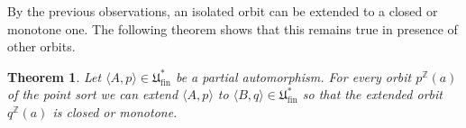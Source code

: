 \documentclass[10pt,a4paper]{article}
\newtheorem{tw}{Theorem}[section]
\theoremstyle{definition}
\theoremstyle{remark}
\newtheorem{observation}[tw]{Observation}
\newcommand \seq [1]{\langle #1 \rangle}
\newcommand \Z {\mathbb{Z}}
\newcommand \fin {{\operatorname{fin}}}
\newcommand \Ult {\mathfrak{U}}
\begin{document}

\medskip
By the previous observations,  an isolated orbit can be extended to a closed or monotone one.
The following theorem shows that this remains true in presence of other orbits.

\color{black}

\begin{tw}\label{closedormonotone}
    Let $\seq{A, p} \in \Ult^*_\fin$ be a partial automorphism.
    For every orbit $p^\Z(a)$ of the point sort we can extend $\seq{A, p}$ to $\seq{B, q} \in \Ult^*_\fin$ so that the extended orbit $q^\Z(a)$ is closed or monotone.
\end{tw}
\end{document}

